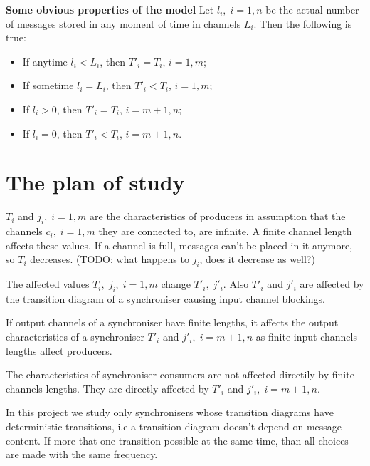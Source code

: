 \textbf{Some obvious properties of the model}
Let $l_{i}, \; i = 1,n$ be the actual number of messages stored in any moment of time in channels $L_{i}$. Then the following is true:
  \begin{itemize}
  \item If anytime $l_{i} < L_{i}$, then $T'_{i} = T_{i}$, $i = 1,m$;
  \item If sometime $l_{i} = L_{i}$, then $T'_{i} < T_{i}$, $i = 1,m$;
  \item If $l_{i} > 0$, then $T'_{i} = T_{i}$, $i = m+1,n$;
  \item If $l_{i} = 0$, then $T'_{i} < T_{i}$, $i = m+1,n$.
  \end{itemize}


\section{The plan of study}


$T_{i}$ and $j_{i}, \; i=1,m$ are the characteristics of producers in assumption that the channels $c_{i}, \; i=1,m$ they are connected to, are infinite. A finite channel length affects these values. If a channel is full, messages can't be placed in it anymore, so $T_{i}$ decreases. (TODO: what happens to $j_{i}$, does it decrease as well?)

The affected values $T_{i}, \; j_{i}, \; i=1,m$ change $T'_{i}, \; j'_{i}$. Also $T'_{i}$ and $j'_{i}$ are affected by the transition diagram of a synchroniser causing input channel blockings.

If output channels of a synchroniser have finite lengths, it affects the output characteristics of a synchroniser $T'_{i}$ and $j'_{i}, \; i=m+1,n$ as finite input channels lengths affect producers.

The characteristics of synchroniser consumers are not affected directily by finite channels lengths. They are directly affected by $T'_{i}$ and $j'_{i}, \; i=m+1,n$.


In this project we study only synchronisers whose transition diagrams have deterministic transitions, i.e a transition diagram doesn't depend on message content. If more that one transition possible at the same time, than all choices are made with the same frequency.

